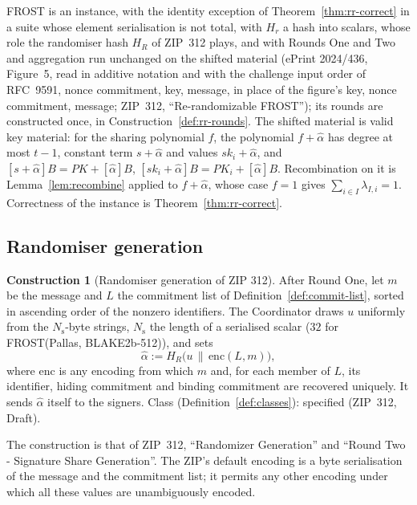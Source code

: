 \documentclass[11pt,a4paper]{article}
\theoremstyle{definition}
\newtheorem{construction}[theorem]{Construction}
\begin{document}
FROST is an instance, with the identity exception of
Theorem~\ref{thm:rr-correct} in a suite whose element serialisation is not
total, with \(H_r\) a hash into scalars, whose role the
randomiser hash \(H_R\) of ZIP~312 plays, and with Rounds One and Two and
aggregation run unchanged on the shifted material (ePrint 2024/436,
Figure~5, read in additive notation and with the challenge input order of
RFC~9591, nonce commitment, key, message, in place of the figure's key,
nonce commitment, message; ZIP~312, ``Re-randomizable FROST''); its rounds
are constructed once, in Construction~\ref{def:rr-rounds}. The shifted
material is valid key material: for the sharing polynomial \(f\), the
polynomial \(f + \hat{\alpha}\) has degree at most \(t - 1\), constant term
\(s + \hat{\alpha}\) and values \(\mathit{sk}_i + \hat{\alpha}\), and
\([s + \hat{\alpha}]B = \mathit{PK} + [\hat{\alpha}]B\),
\([\mathit{sk}_i + \hat{\alpha}]B = \mathit{PK}_i + [\hat{\alpha}]B\).
Recombination on it is Lemma~\ref{lem:recombine} applied to
\(f + \hat{\alpha}\), whose case \(f = 1\) gives
\(\sum_{i \in I} \lambda_{I,i} = 1\). Correctness of the instance is
Theorem~\ref{thm:rr-correct}.

\subsection{Randomiser generation}\label{sec:rr-randomiser}

\begin{construction}[Randomiser generation of ZIP 312]\label{def:rand-zip}
After Round One, let \(m\) be the message and \(L\) the commitment list of
Definition~\ref{def:commit-list}, sorted in ascending order of the nonzero
identifiers. The Coordinator draws \(u\) uniformly from the
\(N_{\mathrm{s}}\)-byte strings, \(N_{\mathrm{s}}\) the length of a
serialised scalar (\(32\) for FROST(Pallas, BLAKE2b-512)), and sets
\[
  \hat{\alpha} := H_R\bigl(u \,\|\, \mathrm{enc}(L, m)\bigr) ,
\]
where \(\mathrm{enc}\) is any encoding from which \(m\) and, for each member
of \(L\), its identifier, hiding commitment and binding commitment are
recovered uniquely. It sends \(\hat{\alpha}\) itself to the signers.
Class (Definition~\ref{def:classes}): specified (ZIP~312, Draft).
\end{construction}

The construction is that of ZIP~312, ``Randomizer Generation'' and ``Round
Two - Signature Share Generation''. The ZIP's default encoding is a byte
serialisation of the message and the commitment list; it permits any other
encoding under which all these values are unambiguously encoded.
\end{document}

